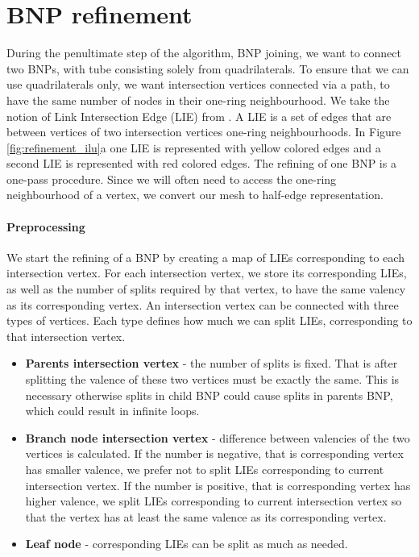 \section{BNP refinement}\label{sec:bnp_sub}
During the penultimate step of the algorithm, BNP joining, we want to connect two BNPs, with tube consisting solely from quadrilaterals. To ensure that we can use quadrilaterals only, we want intersection vertices connected via a path, to have the same number of nodes in their one-ring neighbourhood. We take the notion of Link Intersection Edge (LIE) from \cite{sqm}. A LIE is a set of edges that are between vertices of two intersection vertices one-ring neighbourhoods. In Figure \ref{fig:refinement_ilu}a one LIE is represented with yellow colored edges and a second LIE is represented with red colored edges. The refining of one BNP is a one-pass procedure. Since we will often need to access the one-ring neighbourhood of a vertex, we convert our mesh to half-edge representation.

\paragraph{Preprocessing}
We start the refining of a BNP by creating a map of LIEs corresponding to each intersection vertex. For each intersection vertex, we store its corresponding LIEs, as well as the number of splits required by that vertex, to have the same valency as its corresponding vertex. An intersection vertex can be connected with three types of vertices. Each type defines how much we can split LIEs, corresponding to that intersection vertex.
\begin{itemize}
	\itemsep-0.25em 
	\item \textbf{Parents intersection vertex} - the number of splits is fixed. That is after splitting the valence of these two vertices must be exactly the same. This is necessary otherwise splits in child BNP could cause splits in parents BNP, which could result in infinite loops.
	\item \textbf{Branch node intersection vertex} - difference between valencies of the two vertices is calculated. If the number is negative, that is corresponding vertex has smaller valence, we prefer not to split LIEs corresponding to current intersection vertex. If the number is positive, that is corresponding vertex has higher valence, we split LIEs corresponding to current intersection vertex so that the vertex has at least the same valence as its corresponding vertex.
	\item \textbf{Leaf node} - corresponding LIEs can be split as much as needed.
\end{itemize}


